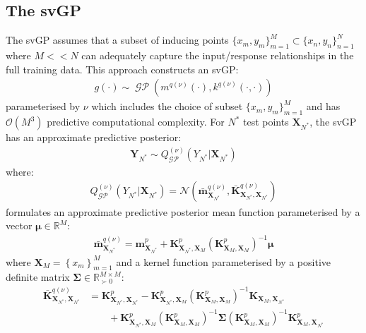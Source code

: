 \documentclass{article}
\newcommand{\GP}{\operatorname{\mathcal{GP}}}
\numberwithin{equation}{section}
\begin{document}
\subsection{The svGP}
The svGP assumes that a subset of inducing points $\{x_m, y_m\}_{m=1}^{M} \subset \{x_n, y_n\}_{n=1}^{N}$ where $M << N$ can adequately capture the input/response relationships in the full training data. This approach constructs an svGP:
\begin{align}
g(\cdot) \sim \GP\left(m^{q(\nu)}(\cdot), k^{q(\nu)}(\cdot, \cdot)\right)
\label{svgp}
\end{align}
parameterised by $\nu$ which includes the choice of subset $\{x_m, y_m\}_{m=1}^{M}$ and has $\mathcal{O}(M^3)$ predictive computational complexity. For $N^*$ test points $\mathbf{X}_{N^*}$, the svGP has an approximate predictive posterior:
\begin{align}
    \mathbf{Y}_{N^*} \sim Q_{\GP}^{(\nu)}\left(Y_{N^*} \vert \mathbf{X}_{N^*}\right)
\end{align}
where:
\begin{align}
    Q_{\GP}^{(\nu)}\left(Y_{N^*} \vert \mathbf{X}_{N^*}\right) = \mathcal{N}\left(\bar{\mathbf{m}}_{\mathbf{X}_{N^*}}^{q(\nu)}, \bar{\mathbf{K}}_{\mathbf{X}_{N^*}, \mathbf{X}_{N^*}}^{q(\nu)}\right)
\end{align}
\cite{titsias2009variational} formulates an approximate predictive posterior mean function parameterised by a vector $\boldsymbol{\mu} \in \mathbb{R}^M$:
\begin{align}
    \label{svgp-mean} 
    \bar{\mathbf{m}}_{\mathbf{X}_{N^*}}^{q(\nu)} = \mathbf{m}^p_{\mathbf{X}_{N^*}} + \mathbf{K}^p_{\mathbf{X}_{N^*}, \mathbf{X}_M}\left(\mathbf{K}^p_{\mathbf{X}_M,\mathbf{X}_M}\right)^{-1} \boldsymbol{\mu}
\end{align}
where $\mathbf{X}_M = \left\{ x_m\right\}_{m=1}^M$ and a kernel function parameterised by a positive definite matrix $\mathbf{\Sigma} \in \mathbb{R}^{M\times M}_{\succ 0}$:
\begin{align}
\bar{\mathbf{K}}_{\mathbf{X}_{N^*}, \mathbf{X}_{N^*}}^{q(\nu)} & = \mathbf{K}^p_{\mathbf{X}_{N^*}, \mathbf{X}_{N^*}} - \mathbf{K}^p_{\mathbf{X}_{N^*}, \mathbf{X}_M} \left(\mathbf{K}^p_{\mathbf{X}_M, \mathbf{X}_M}\right)^{-1}\mathbf{K}_{\mathbf{X}_M, \mathbf{X}_{N^*}} \nonumber \\
&\qquad + \mathbf{K}^p_{\mathbf{X}_{N^*}, \mathbf{X}_M}  \left(\mathbf{K}^p_{\mathbf{X}_M, \mathbf{X}_M}\right)  ^{-1} \mathbf{\Sigma} \left(\mathbf{K}^p_{\mathbf{X}_M, \mathbf{X}_M}\right)^{-1}\mathbf{K}^p_{\mathbf{X}_M, \mathbf{X}_{N^*}}
\label{svgp-covariance}
\end{align}
\end{document}
